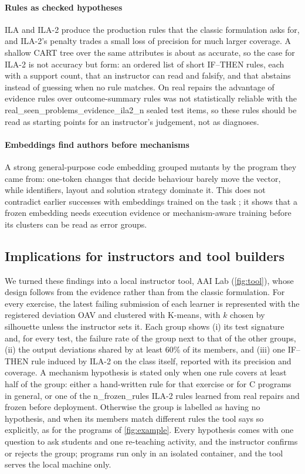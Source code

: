 \paragraph{Rules as checked hypotheses}
ILA and ILA-2 produce the production rules that the classic formulation asks for, and ILA-2's penalty trades a small loss of precision for much larger coverage. A shallow CART tree over the same attributes is about as accurate, so the case for ILA-2 is not accuracy but form: an ordered list of short IF--THEN rules, each with a support count, that an instructor can read and falsify, and that abstains instead of guessing when no rule matches. On real repairs the advantage of evidence rules over outcome-summary rules was not statistically reliable with the {{real_seen_problems_evidence_ila2_n}} sealed test items, so these rules should be read as starting points for an instructor's judgement, not as diagnoses.

\paragraph{Embeddings find authors before mechanisms}
A strong general-purpose code embedding grouped mutants by the program they came from: one-token changes that decide behaviour barely move the vector, while identifiers, layout and solution strategy dominate it. This does not contradict earlier successes with embeddings trained on the task \citep{shi2021misconception,piech2015embeddings}; it shows that a frozen embedding needs execution evidence or mechanism-aware training before its clusters can be read as error groups.

\subsection{Implications for instructors and tool builders}\label{sec:tool}
We turned these findings into a local instructor tool, AAI Lab (\cref{fig:tool}), whose design follows from the evidence rather than from the classic formulation. For every exercise, the latest failing submission of each learner is represented with the registered deviation OAV and clustered with K-means, with $k$ chosen by silhouette unless the instructor sets it. Each group shows (i) its test signature and, for every test, the failure rate of the group next to that of the other groups, (ii) the output deviations shared by at least 60\% of its members, and (iii) one IF--THEN rule induced by ILA-2 on the class itself, reported with its precision and coverage. A mechanism hypothesis is stated only when one rule covers at least half of the group: either a hand-written rule for that exercise or for C programs in general, or one of the {{n_frozen_rules}} ILA-2 rules learned from real repairs and frozen before deployment. Otherwise the group is labelled as having no hypothesis, and when its members match different rules the tool says so explicitly, as for the programs of \cref{fig:example}. Every hypothesis comes with one question to ask students and one re-teaching activity, and the instructor confirms or rejects the group; programs run only in an isolated container, and the tool serves the local machine only.

